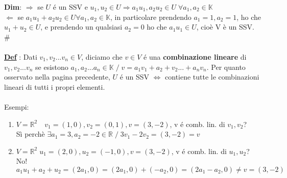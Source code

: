 \documentclass[12pt]{article}
\begin{document}
\textbf{Dim}: $\Rightarrow$ se $U$ é un SSV e $u_1,u_2 \in U \Rightarrow a_1u_1, a_2u_2 \in U \; \forall a_1,a_2 \in \mathbb{K}$\\
$\Leftarrow$ se $a_1u_1 + a_2u_2 \in U \forall a_1,a_2 \in \mathbb{K}$, in particolare prendendo $a_1 = 1, a_2 = 1$, ho che $u_1+u_2 \in U$, e prendendo un qualsiasi $a_2 = 0$ ho che $a_1u_1 \in U$, cioè V è un SSV. \# \\\\
\textbf{\underline{Def}} : Dati $v_1, v_2...v_n \in V$, diciamo che $v\in V$ é una \textbf{combinazione lineare} di $v_1,v_2...v_n$ se esistono $a_1,a_2...a_n \in \mathbb{K}\; /\; v=a_1v_1+a_2+v_2...+a_nv_n$. Per quanto osservato nella pagina precedente, $U$ é un SSV $\iff$ contiene tutte le combinazioni lineari di tutti i propri elementi.\\\\
Esempi:
\begin{enumerate}
    \item $V = \mathbb{R}^2\quad v_1 = (1,0), v_2 = (0,1), v=(3,-2)$, v é comb. lin. di $v_1,v_2$?\\Sì 
    perchè $\exists a_1 = 3, a_2 = -2 \in \mathbb{R} \;/\; 3v_1 - 2v_2 = (3,-2) = v$\\
    \item $V = \mathbb{R}^2 \; u_1 = (2,0), u_2 = (-1,0), v=(3, -2)$, v é comb. lin. di $u_1,u_2$? No! 
    $a_1u_1 + a_2+u_2 = (2a_1,0) = (2a_1,0) + (-a_2,0) = (2a_1 - a_2,0) \neq v=(3,-2)$
\end{enumerate}
\end{document}
